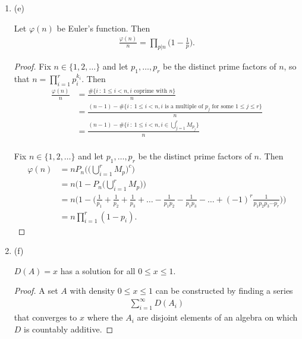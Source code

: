 \begin{enumerate}
\begin{enumerate}[label=(\alph*)]
  \item (e)
    \begin{claim*}
      Let $\varphi(n)$ be Euler's function. Then
      \begin{align*}
        \frac{\varphi(n)}{n} = \prod_{p|n}\big(1 - \frac{1}{p}\big).
      \end{align*}
    \end{claim*}
    \begin{proof}
      Fix $n \in \{1, 2, \ldots\}$ and let $p_1, \ldots, p_r$ be the distinct prime factors of $n$, so that $n = \prod_{i=1}^rp_i^{k_i}$.
      Then
      \begin{align*}
        \frac{\varphi(n)}{n} &= \frac{\#\big\{i ~:~ 1 \leq i < n, i \text{~coprime with~} n\big\}}{n} \\
                             &= \frac{(n - 1) - \#\big\{i ~:~ 1 \leq i < n, i \text{~is a multiple of~} p_j \text{~for some~} 1 \leq j \leq r\big\}}{n} \\
                             &= \frac{(n - 1) - \#\big\{i ~:~ 1 \leq i < n, i \in \bigcup_{j=1}^r M_{p_j}\big\}}{n} \\
      \end{align*}



      Fix $n \in \{1, 2, \ldots\}$ and let $p_1, \ldots, p_r$ be the distinct prime factors of $n$.
      Then
      \begin{align*}
        \varphi(n)
        &= n P_n\Big(\big(\bigcup_{i=1}^r M_p\big)^c\Big) \\
        &= n \Big(1 - P_n\big(\bigcup_{i=1}^r M_p\big)\Big) \\
        &= n \Big(1 - \Big(\frac{1}{p_1} + \frac{1}{p_2} + \frac{1}{p_3} + \ldots - \frac{1}{p_1p_2} - \frac{1}{p_1p_3} - \ldots + (-1)^r\frac{1}{p_1p_2p_3\cdots p_r}\Big)\Big) \\
        &= n \prod_{i=1}^r(1 - p_i).
      \end{align*}
    \end{proof}

  \item (f)
    \begin{claim*}
	    $D(A) = x$ has a solution for all $0 \leq x \leq 1$.
    \end{claim*}
    \begin{proof}
      A set $A$ with density $ 0 \leq x \leq 1$ can be constructed by finding a series
      \begin{align*}
        \sum_{i=1}^\infty D(A_i)
      \end{align*}
      that converges to $x$ where the $A_i$ are disjoint elements of an algebra on which $D$ is countably
      additive.


\end{proof}
\end{enumerate}
\end{enumerate}

